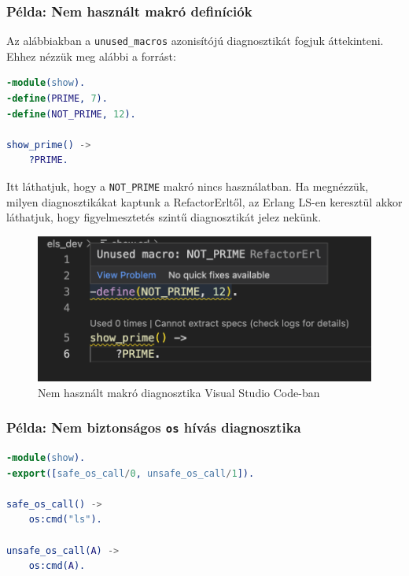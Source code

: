 \subsubsection{Példa: Nem használt makró definíciók}

Az alábbiakban a \lstinline{unused_macros} azonisítójú diagnosztikát fogjuk áttekinteni. Ehhez nézzük meg alábbi a forrást:

\begin{lstlisting}[language={Erlang}]
-module(show).
-define(PRIME, 7).
-define(NOT_PRIME, 12).

show_prime() ->
    ?PRIME.
\end{lstlisting}

Itt láthatjuk, hogy a \lstinline{NOT_PRIME} makró nincs használatban. Ha megnézzük, milyen diagnosztikákat kaptunk a RefactorErltől, az Erlang LS-en keresztül akkor láthatjuk, hogy figyelmesztetés szintű diagnosztikát jelez nekünk.

\begin{figure}[H]
  \centering
  \includegraphics[width=0.7\linewidth]{images/undefined_macro.png}
  \caption{Nem használt makró diagnosztika Visual Studio Code-ban}
  \label{fig:unused_macro_vscode}
\end{figure}


\subsubsection{Példa: Nem biztonságos \lstinline{os} hívás diagnosztika}

\begin{lstlisting}[language={Erlang}] 
-module(show).
-export([safe_os_call/0, unsafe_os_call/1]).

safe_os_call() ->
    os:cmd("ls").

unsafe_os_call(A) ->
    os:cmd(A).
\end{lstlisting}

